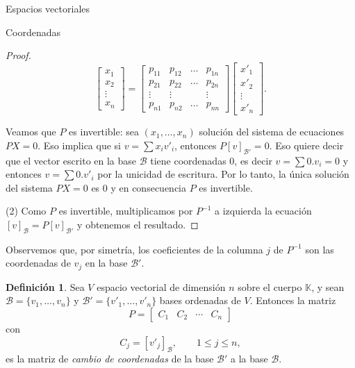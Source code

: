 \documentclass[a4paper,12pt,twoside,spanish]{amsbook}
\theoremstyle{definition}
\newtheorem{definicion}{Definici\'on}[section]
\theoremstyle{remark}
\newcommand{\K}{\mathbb K}
\begin{document}
\begin{chapter}{Espacios vectoriales}
\begin{section}{Coordenadas}
\begin{proof}
		$$
		\begin{bmatrix}x_1 \\ x_2\\ \vdots \\ x_n\end{bmatrix} = 
		\begin{bmatrix}p_{11} &p_{12} & \ldots & p_{1n} \\p_{21} &p_{22} & \ldots & p_{2n} \\ \vdots &\vdots && \vdots\\ p_{n1} &p_{n2} & \ldots & p_{nn}\end{bmatrix}
		 \begin{bmatrix}x'_1 \\ x'_2\\ \vdots \\ x'_n\end{bmatrix}.
		$$
		
		Veamos que $P$  es invertible: sea $(x_1,\ldots,x_n)$ solución del sistema de ecuaciones $PX =0$. Eso implica que si $v =\sum x_i v'_i$,  entonces $P[v]_{\mathcal B'}=0$.     Eso quiere decir que el vector  escrito en la base $\mathcal B$ tiene coordenadas $0$,  es decir $v = \sum 0. v_i =0$ y entonces $v = \sum 0. v'_i$ por la unicidad de escritura. Por lo tanto, la única solución del sistema $PX=0$ es 0 y en consecuencia $P$  es invertible.
		
		(2)  Como $P$ es invertible, multiplicamos por $P^{-1}$  a izquierda la ecuación $[v]_\mathcal{B} = P[v]_\mathcal{B'}$ y obtenemos el resultado.
	\end{proof}

	Observemos que, por simetría,  los coeficientes de la columna $j$ de $P^{-1}$ son las coordenadas de $v_j$ en la base $\mathcal{B'}$. 
	
	\begin{definicion} 
		Sea $V$  espacio vectorial de dimensión $n$  sobre el cuerpo $\K$, 	y sean $\mathcal{B} = \{v_1,\ldots,v_n\}$ y $\mathcal{B'} = \{v'_1,\ldots,v'_n\}$ bases ordenadas de $V$. Entonces la matriz
		$$
		P = \begin{bmatrix}
		 C_1 &C_2 &\cdots &C_n
		\end{bmatrix}
		$$
		con 
		$$
			C_j = [v'_j]_\mathcal{B},\qquad 1 \le j \le n,
		$$
		es la matriz de \textit{cambio de coordenadas} de la base $\mathcal{B'}$  a la base $\mathcal{B}$.
	\end{definicion}
	

\end{section}
\end{chapter}
\end{document}
